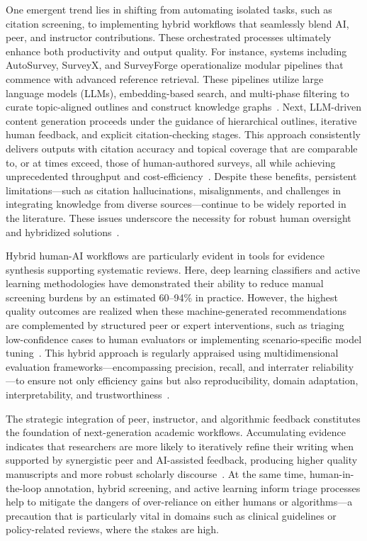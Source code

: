 \documentclass[sigconf]{acmart}
\begin{document}
One emergent trend lies in shifting from automating isolated tasks, such as citation screening, to implementing hybrid workflows that seamlessly blend AI, peer, and instructor contributions. These orchestrated processes ultimately enhance both productivity and output quality. For instance, systems including AutoSurvey, SurveyX, and SurveyForge operationalize modular pipelines that commence with advanced reference retrieval. These pipelines utilize large language models (LLMs), embedding-based search, and multi-phase filtering to curate topic-aligned outlines and construct knowledge graphs~\cite{ref10,ref12,ref35,ref76}. Next, LLM-driven content generation proceeds under the guidance of hierarchical outlines, iterative human feedback, and explicit citation-checking stages. This approach consistently delivers outputs with citation accuracy and topical coverage that are comparable to, or at times exceed, those of human-authored surveys, all while achieving unprecedented throughput and cost-efficiency~\cite{ref10,ref12,ref29,ref35,ref46,ref51}. Despite these benefits, persistent limitations—such as citation hallucinations, misalignments, and challenges in integrating knowledge from diverse sources—continue to be widely reported in the literature. These issues underscore the necessity for robust human oversight and hybridized solutions~\cite{ref10,ref11,ref35,ref39,ref46,ref47,ref51,ref62}.

Hybrid human-AI workflows are particularly evident in tools for evidence synthesis supporting systematic reviews. Here, deep learning classifiers and active learning methodologies have demonstrated their ability to reduce manual screening burdens by an estimated 60--94\% in practice. However, the highest quality outcomes are realized when these machine-generated recommendations are complemented by structured peer or expert interventions, such as triaging low-confidence cases to human evaluators or implementing scenario-specific model tuning~\cite{ref28,ref29,ref30,ref37,ref39,ref49,ref80,ref86,ref88,ref89,ref91,ref92,ref94,ref96,ref98,ref107,ref108}. This hybrid approach is regularly appraised using multidimensional evaluation frameworks—encompassing precision, recall, and interrater reliability—to ensure not only efficiency gains but also reproducibility, domain adaptation, interpretability, and trustworthiness~\cite{ref28,ref29,ref31,ref38,ref39,ref49,ref62,ref76,ref80,ref88,ref89,ref90,ref91,ref94,ref96,ref97,ref98,ref108}.

The strategic integration of peer, instructor, and algorithmic feedback constitutes the foundation of next-generation academic workflows. Accumulating evidence indicates that researchers are more likely to iteratively refine their writing when supported by synergistic peer and AI-assisted feedback, producing higher quality manuscripts and more robust scholarly discourse~\cite{ref88,ref89,ref91,ref92,ref96,ref98,ref107,ref108}. At the same time, human-in-the-loop annotation, hybrid screening, and active learning inform triage processes help to mitigate the dangers of over-reliance on either humans or algorithms—a precaution that is particularly vital in domains such as clinical guidelines or policy-related reviews, where the stakes are high.
\end{document}
